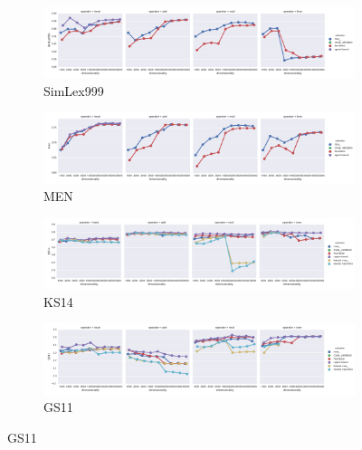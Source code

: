 \begin{figure}
  \centering

  \begin{subfigure}[t]{\textwidth}
    \includegraphics[width=\textwidth]{supplement/figures/universal-results-simlex999}
    \caption{SimLex999}
    \label{fig:universal-results-simlex}
  \end{subfigure}

  \begin{subfigure}[t]{\textwidth}
    \includegraphics[width=\textwidth]{supplement/figures/universal-results-men}
    \caption{MEN}
    \label{fig:universal-results-men}
  \end{subfigure}


  \begin{subfigure}[t]{\textwidth}
    \includegraphics[width=\textwidth]{supplement/figures/universal-results-ks14}
    \caption{KS14}
    \label{fig:universal-results-ks14}
  \end{subfigure}

  \begin{subfigure}[t]{\textwidth}
    \includegraphics[width=\textwidth]{supplement/figures/universal-results-gs11}
    \caption{GS11}
    \label{fig:universal-results-gs11}
  \end{subfigure}


\end{figure}
